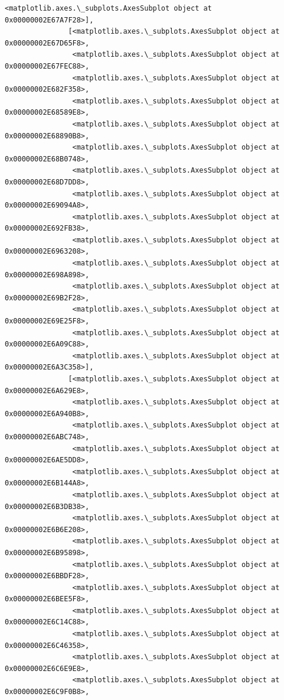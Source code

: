 \documentclass[11pt]{article}
\begin{document}
\begin{Verbatim}[commandchars=\\\{\}]
                <matplotlib.axes.\_subplots.AxesSubplot object at 0x00000002E67A7F28>],
               [<matplotlib.axes.\_subplots.AxesSubplot object at 0x00000002E67D65F8>,
                <matplotlib.axes.\_subplots.AxesSubplot object at 0x00000002E67FEC88>,
                <matplotlib.axes.\_subplots.AxesSubplot object at 0x00000002E682F358>,
                <matplotlib.axes.\_subplots.AxesSubplot object at 0x00000002E68589E8>,
                <matplotlib.axes.\_subplots.AxesSubplot object at 0x00000002E68890B8>,
                <matplotlib.axes.\_subplots.AxesSubplot object at 0x00000002E68B0748>,
                <matplotlib.axes.\_subplots.AxesSubplot object at 0x00000002E68D7DD8>,
                <matplotlib.axes.\_subplots.AxesSubplot object at 0x00000002E69094A8>,
                <matplotlib.axes.\_subplots.AxesSubplot object at 0x00000002E692FB38>,
                <matplotlib.axes.\_subplots.AxesSubplot object at 0x00000002E6963208>,
                <matplotlib.axes.\_subplots.AxesSubplot object at 0x00000002E698A898>,
                <matplotlib.axes.\_subplots.AxesSubplot object at 0x00000002E69B2F28>,
                <matplotlib.axes.\_subplots.AxesSubplot object at 0x00000002E69E25F8>,
                <matplotlib.axes.\_subplots.AxesSubplot object at 0x00000002E6A09C88>,
                <matplotlib.axes.\_subplots.AxesSubplot object at 0x00000002E6A3C358>],
               [<matplotlib.axes.\_subplots.AxesSubplot object at 0x00000002E6A629E8>,
                <matplotlib.axes.\_subplots.AxesSubplot object at 0x00000002E6A940B8>,
                <matplotlib.axes.\_subplots.AxesSubplot object at 0x00000002E6ABC748>,
                <matplotlib.axes.\_subplots.AxesSubplot object at 0x00000002E6AE5DD8>,
                <matplotlib.axes.\_subplots.AxesSubplot object at 0x00000002E6B144A8>,
                <matplotlib.axes.\_subplots.AxesSubplot object at 0x00000002E6B3DB38>,
                <matplotlib.axes.\_subplots.AxesSubplot object at 0x00000002E6B6E208>,
                <matplotlib.axes.\_subplots.AxesSubplot object at 0x00000002E6B95898>,
                <matplotlib.axes.\_subplots.AxesSubplot object at 0x00000002E6BBDF28>,
                <matplotlib.axes.\_subplots.AxesSubplot object at 0x00000002E6BEE5F8>,
                <matplotlib.axes.\_subplots.AxesSubplot object at 0x00000002E6C14C88>,
                <matplotlib.axes.\_subplots.AxesSubplot object at 0x00000002E6C46358>,
                <matplotlib.axes.\_subplots.AxesSubplot object at 0x00000002E6C6E9E8>,
                <matplotlib.axes.\_subplots.AxesSubplot object at 0x00000002E6C9F0B8>,

\end{Verbatim}
\end{document}
